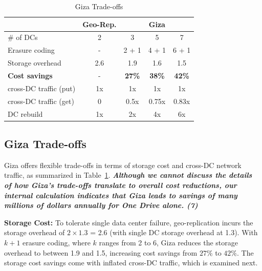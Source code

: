 \begin{table}[tp]
\centering
\footnotesize
\begin{tabular}{|l||c||c|c|c|}
\hline
											& Geo-Rep.						& \multicolumn{3}{c|}{Giza}
\\ \hline \hline
\# of DCs 						& 2										& 3 		& 5 		& 7
\\ \hline
Erasure coding 				& -										& 2 + 1	& 4 + 1	& 6 + 1
\\ \hline \hline
Storage overhead			& 2.6									& 1.9 	& 1.6 	& 1.5
\\ \hline
{\bf Cost savings}		& -										& {\bf 27\%} 	& {\bf 38\%} 	& {\bf 42\%}
\\ \hline \hline
cross-DC traffic (put)& 1x									& 1x 		& 1x 		& 1x
\\ \hline
cross-DC traffic (get)& 0										& 0.5x 	& 0.75x & 0.83x
\\ \hline
DC rebuild 						& 1x									& 2x 		& 4x 		& 6x
\\ \hline \hline
\end{tabular}
\caption{Giza Trade-offs}
\label{tab:cost_benefit}
\end{table}


\subsection{Giza Trade-offs}
\label{sec:alternative}

Giza offers flexible trade-offs in terms of storage cost and cross-DC network traffic,
as summarized in Table~\ref{tab:cost_benefit}. \textit{\textbf{Although we cannot discuss the details of how Giza's trade-offs translate to overall cost reductions, our internal calculation 
indicates that Giza leads to savings of many millions of dollars annually for One Drive alone. (7)}}

{\bf Storage Cost:}
To tolerate single data center failure, geo-replication incurs the storage overhead of $2\times1.3$ = 2.6 (with single DC storage overhead at 1.3).
With $k+1$ erasure coding, where $k$ ranges from 2 to 6, Giza reduces the storage overhead to between 1.9 and 1.5, increasing cost savings from $27\%$ to $42\%$.
The storage cost savings come with inflated cross-DC traffic, which is examined next.


